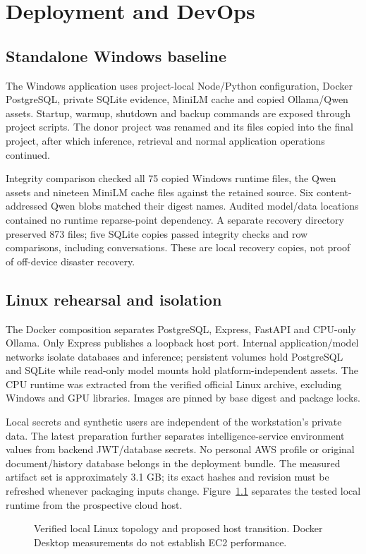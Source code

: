 \documentclass[11pt,a4paper,oneside]{report}
\newcommand{\ShortCaption}[1]{\csname ShortCaption#1\endcsname}
\newcommand{\diagram}[3]{\par\begin{figure}[htbp]\centering\sbox{\DiagramBox}{}\ifdim\wd\DiagramBox>\linewidth\resizebox{\linewidth}{!}{\usebox{\DiagramBox}}\else\usebox{\DiagramBox}\fi\caption[\ShortCaption{#1}]{#2}\label{fig:#3}\end{figure}\par}
\begin{document}
\chapter{Deployment and DevOps}
\section{Standalone Windows baseline}
The Windows application uses project-local Node/Python configuration, Docker PostgreSQL, private SQLite evidence, MiniLM cache and copied Ollama/Qwen assets. Startup, warmup, shutdown and backup commands are exposed through project scripts. The donor project was renamed and its files copied into the final project, after which inference, retrieval and normal application operations continued.

Integrity comparison checked all 75 copied Windows runtime files, the Qwen assets and nineteen MiniLM cache files against the retained source. Six content-addressed Qwen blobs matched their digest names. Audited model/data locations contained no runtime reparse-point dependency. A separate recovery directory preserved 873 files; five SQLite copies passed integrity checks and row comparisons, including conversations. These are local recovery copies, not proof of off-device disaster recovery.
\section{Linux rehearsal and isolation}
The Docker composition separates PostgreSQL, Express, FastAPI and CPU-only Ollama. Only Express publishes a loopback host port. Internal application/model networks isolate databases and inference; persistent volumes hold PostgreSQL and SQLite while read-only model mounts hold platform-independent assets. The CPU runtime was extracted from the verified official Linux archive, excluding Windows and GPU libraries. Images are pinned by base digest and package locks.

Local secrets and synthetic users are independent of the workstation's private data. The latest preparation further separates intelligence-service environment values from backend JWT/database secrets. No personal AWS profile or original document/history database belongs in the deployment bundle. The measured artifact set is approximately 3.1 GB; its exact hashes and revision must be refreshed whenever packaging inputs change.
Figure~\ref{fig:deployment} separates the tested local runtime from the prospective cloud host.
\diagram{deployment}{Verified local Linux topology and proposed host transition. Docker Desktop measurements do not establish EC2 performance.}{deployment}
\end{document}
